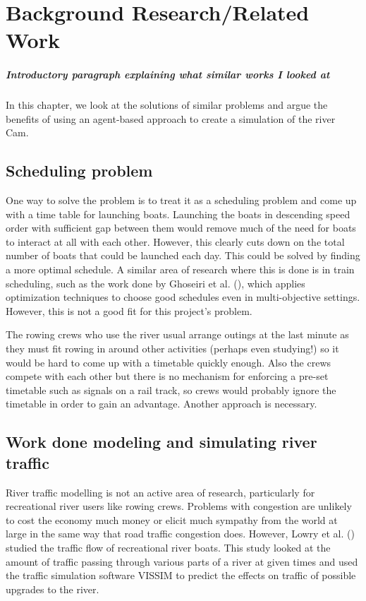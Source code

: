 \chapter{Background Research/Related Work}\label{chapter:background}
  \paragraph{Introductory paragraph explaining what similar works I looked at}
  In this chapter, we look at the solutions of similar problems and argue the benefits of using an agent-based approach to create a simulation of the river Cam.

  \section{Scheduling problem}
    One way to solve the problem is to treat it as a scheduling problem and come up with a time table for launching boats. Launching the boats in descending speed order with sufficient gap between them would remove much of the need for boats to interact at all with each other. However, this clearly cuts down on the total number of boats that could be launched each day. This could be solved by finding a more optimal schedule. A similar area of research where this is done is in train scheduling, such as the work done by Ghoseiri et al. (\cite{Ghoseiri2004}), which applies optimization techniques to choose good schedules even in multi-objective settings. However, this is not a good fit for this project's problem. 
    
    The rowing crews who use the river usual arrange outings at the last minute as they must fit rowing in around other activities (perhaps even studying!) so it would be hard to come up with a timetable quickly enough. Also the crews compete with each other but there is no mechanism for enforcing a pre-set timetable such as signals on a rail track, so crews would probably ignore the timetable in order to gain an advantage. Another approach is necessary.

  \section{Work done modeling and simulating river traffic}
  River traffic modelling is not an active area of research, particularly for recreational river users like rowing crews. Problems with congestion are unlikely to cost the economy much money or elicit much sympathy from the world at large in the same way that road traffic congestion does. However, Lowry et al. (\cite{Lowry2011})  studied the traffic flow of recreational river boats. This study looked at the amount of traffic passing through various parts of a river at given times and used the traffic simulation software VISSIM to predict the effects on traffic of possible upgrades to the river. 
  
